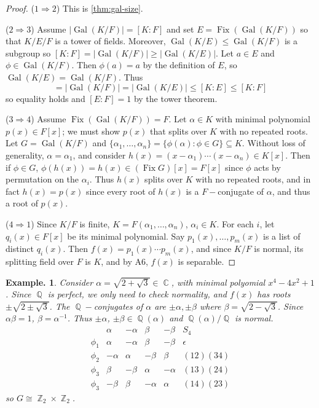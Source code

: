 \documentclass[11pt, a4paper]{memoir}
\DeclareMathOperator{\Q}{{\mathbb{Q}}}
\DeclareMathOperator{\Z}{{\mathbb{Z}}}
\DeclareMathOperator{\C}{{\mathbb{C}}}
\newcommand{\imp}[2]{($#1\Rightarrow#2$)\hspace{0.2cm}}
\theoremstyle{change}
\theoremstyle{plain}
\theoremstyle{nonumberplain}
\newtheorem{example}{Example.}
\newtheorem{proof}{Proof}
\DeclareMathOperator{\Fix}{Fix}
\DeclareMathOperator{\Gal}{Gal}
\numberwithin{equation}{section}
\begin{document}
\begin{proof}
    \imp{1}{2}
    This is \cref{thm:gal-size}.
     
    \imp{2}{3}
    Assume $|\Gal(K/F)|=[K:F]$ and set $E=\Fix(\Gal(K/F))$ so that $K/E/F$ is a tower of fields.
    Moreover, $\Gal(K/E)\leq\Gal(K/F)$ is a subgroup so $[K:F]=|\Gal(K/F)|\geq|\Gal(K/E)|$.
    Let $a\in E$ and $\phi\in\Gal(K/F)$.
    Then $\phi(a)=a$ by the definition of $E$, so $\Gal(K/E)=\Gal(K/F)$.
    Thus
    \begin{equation*}
        [K:F]=|\Gal(K/F)|=|\Gal(K/E)|\leq[K:E]\leq[K:F]
    \end{equation*}
    so equality holds and $[E:F]=1$ by the tower theorem.

    \imp{3}{4}
    Assume $\Fix(\Gal(K/F))=F$.
    Let $\alpha\in K$ with minimal polynomial $p(x)\in F[x]$; we must show $p(x)$ that splits over $K$ with no repeated roots.
    Let $G=\Gal(K/F)$ and $\{\alpha_1,\ldots,\alpha_n\}=\{\phi(\alpha):\phi\in G\}\subseteq K$.
    Without loss of generality, $\alpha=\alpha_1$, and consider $h(x)=(x-\alpha_1)\cdots(x-\alpha_n)\in K[x]$.
    Then if $\phi\in G$, $\phi(h(x))=h(x)\in (\Fix G)[x]=F[x]$ since $\phi$ acts by permutation on the $\alpha_i$.
    Thus $h(x)$ splits over $K$ with no repeated roots, and in fact $h(x)=p(x)$ since every root of $h(x)$ is a $F-$conjugate of $\alpha$, and thus a root of $p(x)$.

    \imp{4}{1}
    Since $K/F$ is finite, $K=F(\alpha_1,\ldots,\alpha_n)$, $\alpha_i\in K$.
    For each $i$, let $q_i(x)\in F[x]$ be its minimal polynomial.
    Say $p_1(x),\ldots,p_m(x)$ is a list of distinct $q_i(x)$.
    Then $f(x)=p_1(x)\cdots p_m(x)$, and since $K/F$ is normal, its splitting field over $F$ is $K$, and by A6, $f(x)$ is separable.
\end{proof}
\begin{example}
    Consider $\alpha=\sqrt{2+\sqrt{3}}\in\C$, with minimal polyomial $x^4-4x^2+1$.
    Since $\Q$ is perfect, we only need to check normality, and $f(x)$ has roots $\pm\sqrt{2\pm\sqrt{3}}$.
    The $\Q-$conjugates of $\alpha$ are $\pm\alpha,\pm\beta$ where $\beta=\sqrt{2-\sqrt{3}}$.
    Since $\alpha\beta=1$, $\beta=\alpha^{-1}$.
    Thus $\pm\alpha$, $\pm\beta\in\Q(\alpha)$ and $\Q(\alpha)/\Q$ is normal.
    \begin{equation*}
        \begin{array}{c|cccc|c}
            & \alpha & -\alpha & \beta & -\beta & S_4\\
            \hline
            \phi_1 & \alpha & -\alpha & \beta & -\beta & \epsilon\\
            \phi_2 & -\alpha & \alpha & -\beta & \beta & (12)(34)\\
            \phi_3 & \beta & -\beta & \alpha & -\alpha & (13)(24)\\
            \phi_3 & -\beta & \beta & -\alpha & \alpha & (14)(23)
        \end{array}
    \end{equation*}
    so $G\cong\Z_2\times\Z_2$.
\end{example}
\end{document}
